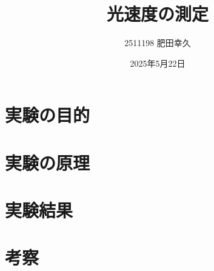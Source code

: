 \documentclass{jarticle}
\title{光速度の測定}
\author{2511198 肥田幸久}
\date{2025年5月22日}
\begin{document}
\maketitle

\section{実験の目的}

\section{実験の原理}

\section{実験結果}

\section{考察}


\begin{thebibliography}{99}


\end{thebibliography}
\end{document}
